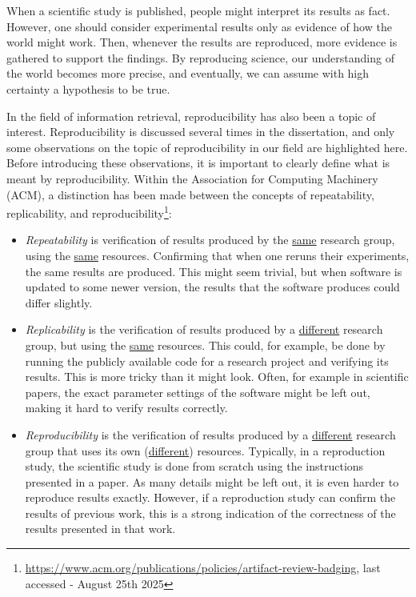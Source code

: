 When a scientific study is published, people might interpret its results as fact. However, one should consider experimental results only as evidence of how the world might work. Then, whenever the results are reproduced, more evidence is gathered to support the findings. By reproducing science, our understanding of the world becomes more precise, and eventually, we can assume with high certainty a hypothesis to be true. 

In the field of information retrieval, reproducibility has also been a topic of interest. Reproducibility is discussed several times in the dissertation, and only some observations on the topic of reproducibility in our field are highlighted here. Before introducing these observations, it is important to clearly define what is meant by reproducibility. Within the Association for Computing Machinery (ACM), a distinction has been made between the concepts of repeatability, replicability, and reproducibility\footnote{\url{https://www.acm.org/publications/policies/artifact-review-badging}, last accessed - August 25th 2025}: 
\begin{itemize}
	\item \emph{Repeatability} is verification of results produced by the \underline{same} research group, using the \underline{same} resources. Confirming that when one reruns their experiments, the same results are produced. This might seem trivial, but when software is updated to some newer version, the results that the software produces could differ slightly. 
	\item \emph{Replicability} is the verification of results produced by a \underline{different} research group, but using the \underline{same} resources. This could, for example, be done by running the publicly available code for a research project and verifying its results. This is more tricky than it might look. Often, for example in scientific papers, the exact parameter settings of the software might be left out, making it hard to verify results correctly. 
	\item \emph{Reproducibility} is the verification of results produced by a \underline{different} research group that uses its own (\underline{different}) resources. Typically, in a reproduction study, the scientific study is done from scratch using the instructions presented in a paper. As many details might be left out, it is even harder to reproduce results exactly. However, if a reproduction study can confirm the results of previous work, this is a strong indication of the correctness of the results presented in that work.
\end{itemize}

